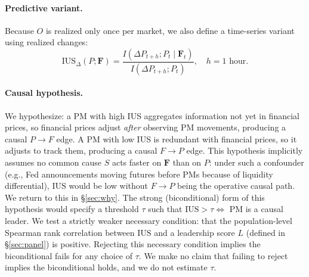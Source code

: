 \documentclass{article}
\begin{document}
\paragraph{Predictive variant.}
Because $O$ is realized only once per market, we also define a time-series variant using realized changes:
\begin{equation}
\mathrm{IUS}_\Delta(P; \mathbf{F}) = \frac{I(\Delta P_{t+h}; P_t \mid \mathbf{F}_t)}{I(\Delta P_{t+h}; P_t)},
\quad h = 1\text{ hour}.
\label{eq:ius_delta}
\end{equation}

\paragraph{Causal hypothesis.}
We hypothesize: a PM with high IUS aggregates information not yet in financial prices, so financial prices adjust \emph{after} observing PM movements, producing a causal $P \to F$ edge. A PM with low IUS is redundant with financial prices, so it adjusts to track them, producing a causal $F \to P$ edge. This hypothesis implicitly assumes no common cause $S$ acts faster on $\mathbf{F}$ than on $P$: under such a confounder (e.g., Fed announcements moving futures before PMs because of liquidity differential), $\mathrm{IUS}$ would be low without $F \to P$ being the operative causal path. We return to this in \S\ref{sec:why}. The strong (biconditional) form of this hypothesis would specify a threshold $\tau$ such that $\mathrm{IUS} > \tau \Leftrightarrow$ PM is a causal leader. We test a strictly weaker necessary condition: that the population-level Spearman rank correlation between $\mathrm{IUS}$ and a leadership score $L$ (defined in \S\ref{sec:panel}) is positive. Rejecting this necessary condition implies the biconditional fails for any choice of $\tau$. We make no claim that failing to reject implies the biconditional holds, and we do not estimate $\tau$.
\end{document}
